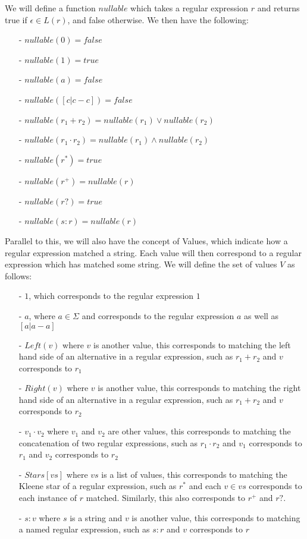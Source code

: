 We will define a function $nullable$ which takes a regular expression $r$ and returns true if $\epsilon \in L(r)$, and false otherwise.
We then have the following:
\begin{enumerate}
    \item[-] $nullable(0) = false$
    \item[-] $nullable(1) = true$
    \item[-] $nullable(a) = false$
    \item[-] $nullable([c|c-c]) = false$
    \item[-] $nullable(r_1 + r_2) = nullable(r_1) \lor nullable(r_2)$
    \item[-] $nullable(r_1 \cdot r_2) = nullable(r_1) \land nullable(r_2)$
    \item[-] $nullable(r^*) = true$
    \item[-] $nullable(r^+) = nullable(r)$
    \item[-] $nullable(r?) = true$
    \item[-] $nullable(s:r) = nullable(r)$
\end{enumerate}

Parallel to this, we will also have the concept of Values, which indicate how a regular expression matched a string.
Each value will then correspond to a regular expression which has matched some string.
We will define the set of values $V$ as follows:
\begin{enumerate}
    \item[-] $1$, which corresponds to the regular expression $1$
    \item[-] $a$, where $a \in \Sigma$ and corresponds to the regular expression $a$ as well as $[a|a-a]$
    \item[-] $Left(v)$ where $v$ is another value, this corresponds to matching the left hand side of an alternative in a regular expression, such as $r_1 + r_2$ and $v$ corresponds to $r_1$
    \item[-] $Right(v)$ where $v$ is another value, this corresponds to matching the right hand side of an alternative in a regular expression, such as $r_1 + r_2$ and $v$ corresponds to $r_2$
    \item[-] $v_1 \cdot v_2$ where $v_1$ and $v_2$ are other values, this corresponds to matching the concatenation of two regular expressions, such as $r_1 \cdot r_2$ and $v_1$ corresponds to $r_1$ and $v_2$ corresponds to $r_2$
    \item[-] $Stars[vs]$ where $vs$ is a list of values, this corresponds to matching the Kleene star of a regular expression, such as $r^*$ and each $v \in vs$ corresponds to each instance of $r$ matched.
    Similarly, this also corresponds to $r^+$ and $r?$.
    \item[-] $s:v$ where $s$ is a string and $v$ is another value, this corresponds to matching a named regular expression, such as $s:r$ and $v$ corresponds to $r$
\end{enumerate}

